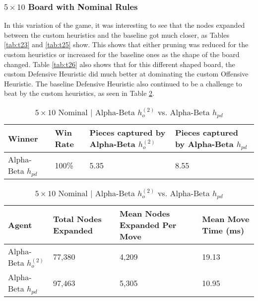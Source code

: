 \documentclass{article}[12pt]
\begin{document}
	\subsubsection{$5 \times 10$ Board with Nominal Rules}
	In this variation of the game, it was interesting to see that the nodes expanded between the custom heuristics and the baseline got much closer, as Tables \ref{tab:t23} and \ref{tab:t25} show. This shows that either pruning was reduced for the custom heuristics or increased for the baseline ones as the shape of the board changed. Table \ref{tab:t26} also shows that for this different shaped board, the custom Defensive Heuristic did much better at dominating the custom Offensive Heuristic. The baseline Defensive Heuristic also continued to be a challenge to beat by the custom heuristics, as seen in Table \ref{tab:t22}.
	
	\begin{table}[ht]
		\centering
		\begin{tabular}{l | l | l | l}
			\hline
			Winner & Win Rate & Pieces captured by Alpha-Beta $h_{o}^{(2)}$ & Pieces captured by Alpha-Beta $h_{pd}$ \\
			\hline \hline 
			Alpha-Beta $h_{pd}$  & 100\% & 5.35 & 8.55 \\
			\hline
		\end{tabular}
		
		\vspace{10px}
		
		\begin{tabular}{l | l | l | l}
			\hline
			Agent & Total Nodes Expanded & Mean Nodes Expanded Per Move & Mean Move Time (ms) \\
			\hline \hline 
			Alpha-Beta $h_{o}^{(2)}$  & 77,380& 4,209& 19.13 \\
			Alpha-Beta $h_{pd}$ & 97,463 & 5,305 & 10.95\\
			\hline
		\end{tabular}
		\caption{$5 \times 10$ Nominal | Alpha-Beta $h_{o}^{(2)}$ vs. Alpha-Beta $h_{pd}$} \label{tab:t22}
	\end{table}
	
\end{document}
